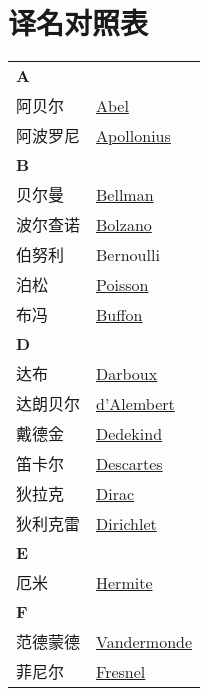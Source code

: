 \chapter{译名对照表}
\def\InsertTable#1{\begin{longtable}{ll} #1 \end{longtable}}%
\InsertTable{
    \textbf{A} \\
    阿贝尔 & \href{https://mathshistory.st-andrews.ac.uk/Biographies/Abel/}{Abel} \\
    阿波罗尼 & \href{https://mathshistory.st-andrews.ac.uk/Biographies/Apollonius/}{Apollonius} \\
    \textbf{B} \\
    贝尔曼 & \href{https://mathshistory.st-andrews.ac.uk/Biographies/Bellman/}{Bellman} \\
    波尔查诺 & \href{https://mathshistory.st-andrews.ac.uk/Biographies/Bolzano/}{Bolzano} \\
    伯努利 & Bernoulli \\
    泊松 & \href{https://mathshistory.st-andrews.ac.uk/Biographies/Poisson/}{Poisson} \\
    布冯 & \href{https://mathshistory.st-andrews.ac.uk/Biographies/Buffon/}{Buffon} \\
    \textbf{D} \\
    达布 & \href{https://mathshistory.st-andrews.ac.uk/Biographies/Darboux/}{Darboux} \\
    达朗贝尔 & \href{https://mathshistory.st-andrews.ac.uk/Biographies/DAlembert/}{d'Alembert} \\
    戴德金 & \href{https://mathshistory.st-andrews.ac.uk/Biographies/Dedekind/}{Dedekind} \\
    笛卡尔 & \href{https://mathshistory.st-andrews.ac.uk/Biographies/Descartes/}{Descartes} \\
    狄拉克 & \href{https://mathshistory.st-andrews.ac.uk/Biographies/Dirac/}{Dirac} \\
    狄利克雷 & \href{https://mathshistory.st-andrews.ac.uk/Biographies/Dirichlet/}{Dirichlet} \\
    \textbf{E} \\
    厄米 & \href{https://mathshistory.st-andrews.ac.uk/Biographies/Hermite/}{Hermite} \\
    \textbf{F} \\
    范德蒙德 & \href{https://mathshistory.st-andrews.ac.uk/Biographies/Vandermonde/}{Vandermonde} \\
    菲尼尔 & \href{https://mathshistory.st-andrews.ac.uk/Biographies/Fresnel/}{Fresnel} \\
}
